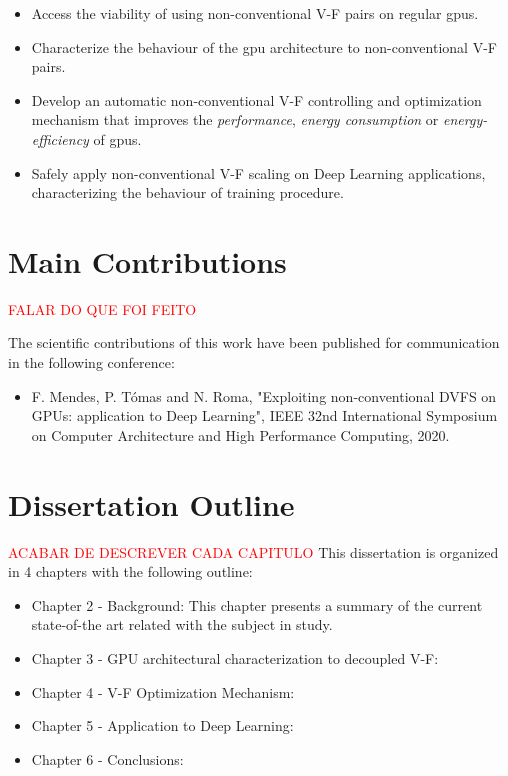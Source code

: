 \begin{itemize}
\item Access the viability of using non-conventional V-F pairs on regular \acrshort{gpu}s.
\item Characterize the behaviour of the \acrshort{gpu} architecture to non-conventional V-F pairs.
\item Develop an automatic non-conventional V-F controlling and optimization mechanism that improves the \textit{performance}, \textit{energy consumption} or \textit{energy-efficiency} of \acrshort{gpu}s.
\item Safely apply non-conventional V-F scaling on Deep Learning applications, characterizing the behaviour of training procedure.
\end{itemize}


\section{Main Contributions}
\label{section:main_contri}


\textcolor{red}{FALAR DO QUE FOI FEITO}

The scientiﬁc contributions of this work have been published for communication in the following conference:

\begin{itemize}
    \item F. Mendes, P. Tómas and N. Roma, "Exploiting non-conventional DVFS on GPUs: application to Deep Learning", IEEE 32nd International Symposium on Computer Architecture and High Performance Computing, 2020.
\end{itemize}


\section{Dissertation Outline}
\label{section:outline}
\textcolor{red}{ACABAR DE DESCREVER CADA CAPITULO}
This dissertation is organized in 4 chapters with the following outline:
\begin{itemize}
    \item Chapter 2 - Background: This chapter presents a summary of the current state-of-the art related with the subject in study.
    \item Chapter 3 - GPU architectural characterization to decoupled V-F:
    \item Chapter 4 - V-F Optimization Mechanism:
    \item Chapter 5 - Application to Deep Learning:
    \item Chapter 6 - Conclusions:
\end{itemize}

